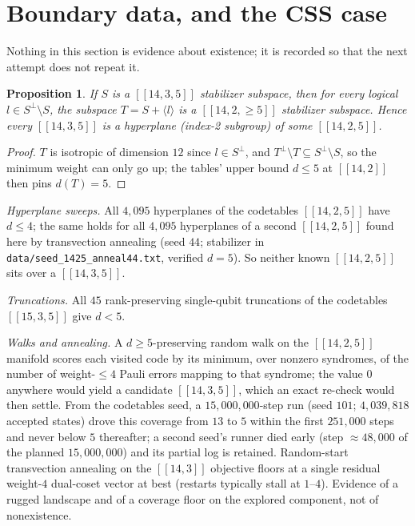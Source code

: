 \documentclass[11pt]{amsart}
\newcommand{\code}[3]{[[#1,#2,#3]]}
\newcommand{\Sperp}{S^{\perp}}
\theoremstyle{plain}
\newtheorem{proposition}[theorem]{Proposition}
\theoremstyle{definition}
\theoremstyle{remark}
\begin{document}
\section{Boundary data, and the CSS case}\label{sec:boundary}

Nothing in this section is evidence about existence; it is recorded so
that the next attempt does not repeat it.

\begin{proposition}\label{prop:hyper}
If $S$ is a $\code{14}{3}{5}$ stabilizer subspace, then for every logical
$l\in\Sperp\setminus S$, the subspace $T=S+\langle l\rangle$ is a
$\code{14}{2}{\ge5}$ stabilizer subspace. Hence every $\code{14}{3}{5}$
is a hyperplane (index-2 subgroup) of some $\code{14}{2}{5}$.
\end{proposition}

\begin{proof}
$T$ is isotropic of dimension $12$ since $l\in\Sperp$, and
$T^{\perp}\setminus T\subseteq\Sperp\setminus S$, so the minimum weight
can only go up; the tables' upper bound $d\le5$ at $[[14,2]]$
\cite{Grassl} then pins $d(T)=5$.
\end{proof}

\emph{Hyperplane sweeps.} All $4{,}095$ hyperplanes of the codetables
$\code{14}{2}{5}$ have $d\le4$; the same holds for all $4{,}095$
hyperplanes of a second $\code{14}{2}{5}$ found here by transvection
annealing (seed $44$; stabilizer in
\texttt{data/seed\_1425\_anneal44.txt}, verified $d=5$). So neither known
$\code{14}{2}{5}$ sits over a $\code{14}{3}{5}$.

\emph{Truncations.} All $45$ rank-preserving single-qubit truncations of
the codetables $\code{15}{3}{5}$ give $d<5$.

\emph{Walks and annealing.} A $d\ge5$-preserving random walk on the
$\code{14}{2}{5}$ manifold scores each visited code by its minimum, over
nonzero syndromes, of the number of weight-$\le4$ Pauli errors mapping to
that syndrome; the value $0$ anywhere would yield a candidate
$\code{14}{3}{5}$, which an exact re-check would then settle. From the
codetables seed, a
$15{,}000{,}000$-step run (seed $101$; $4{,}039{,}818$ accepted states)
drove this coverage from $13$ to $5$ within the first $251{,}000$ steps
and never below $5$ thereafter; a second seed's runner died early (step
$\approx48{,}000$ of the planned $15{,}000{,}000$) and its partial log is
retained. Random-start transvection
annealing on the $[[14,3]]$ objective floors at a single residual
weight-$4$ dual-coset vector at best (restarts typically stall at
$1$--$4$). Evidence of a rugged landscape and of a coverage
floor on the explored component, not of nonexistence.
\end{document}
